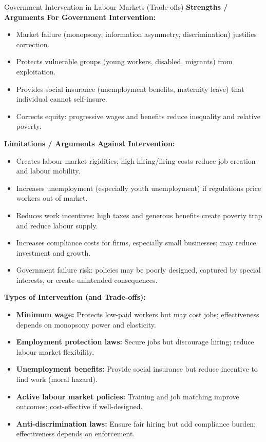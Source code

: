 \documentclass[11pt, a4paper, twoside]{book}
\begin{document}
\begin{evaluation}{Government Intervention in Labour Markets (Trade-offs)}
\textbf{Strengths / Arguments For Government Intervention:}
\begin{itemize}[leftmargin=*, nosep]
\item Market failure (monopsony, information asymmetry, discrimination) justifies correction.
\item Protects vulnerable groups (young workers, disabled, migrants) from exploitation.
\item Provides social insurance (unemployment benefits, maternity leave) that individual cannot self-insure.
\item Corrects equity: progressive wages and benefits reduce inequality and relative poverty.
\end{itemize}
\textbf{Limitations / Arguments Against Intervention:}
\begin{itemize}[leftmargin=*, nosep]
\item Creates labour market rigidities; high hiring/firing costs reduce job creation and labour mobility.
\item Increases unemployment (especially youth unemployment) if regulations price workers out of market.
\item Reduces work incentives: high taxes and generous benefits create poverty trap and reduce labour supply.
\item Increases compliance costs for firms, especially small businesses; may reduce investment and growth.
\item Government failure risk: policies may be poorly designed, captured by special interests, or create unintended consequences.
\end{itemize}
\textbf{Types of Intervention (and Trade-offs):}
\begin{itemize}[leftmargin=*, nosep]
\item \textbf{Minimum wage:} Protects low-paid workers but may cost jobs; effectiveness depends on monopsony power and elasticity.
\item \textbf{Employment protection laws:} Secure jobs but discourage hiring; reduce labour market flexibility.
\item \textbf{Unemployment benefits:} Provide social insurance but reduce incentive to find work (moral hazard).
\item \textbf{Active labour market policies:} Training and job matching improve outcomes; cost-effective if well-designed.
\item \textbf{Anti-discrimination laws:} Ensure fair hiring but add compliance burden; effectiveness depends on enforcement.

\end{itemize}
\end{evaluation}
\end{document}
